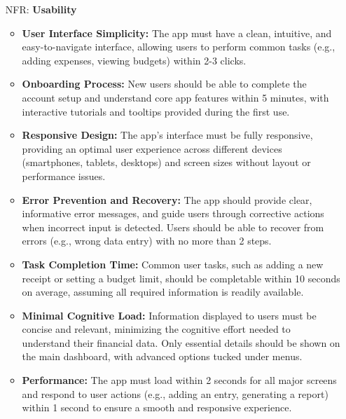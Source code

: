 \documentclass[12pt]{article}
\newcounter{frnum} %
\newcounter{nfrnum} %
\begin{document}
\begin{itemize}
\item[NFR\refstepcounter{nfrnum}\thenfrnum \label{NFR_Usability}:] \textbf{Usability}
\begin{itemize}
	\item \textbf{User Interface Simplicity:} The app must have a clean, intuitive, and easy-to-navigate interface, allowing users to perform common tasks (e.g., adding expenses, viewing budgets) within 2-3 clicks.
	\item \textbf{Onboarding Process:} New users should be able to complete the account setup and understand core app features within 5 minutes, with interactive tutorials and tooltips provided during the first use.
	\item \textbf{Responsive Design:} The app’s interface must be fully responsive, providing an optimal user experience across different devices (smartphones, tablets, desktops) and screen sizes without layout or performance issues.
	\item \textbf{Error Prevention and Recovery:} The app should provide clear, informative error messages, and guide users through corrective actions when incorrect input is detected. Users should be able to recover from errors (e.g., wrong data entry) with no more than 2 steps.
	\item \textbf{Task Completion Time:} Common user tasks, such as adding a new receipt or setting a budget limit, should be completable within 10 seconds on average, assuming all required information is readily available.
	\item \textbf{Minimal Cognitive Load:} Information displayed to users must be concise and relevant, minimizing the cognitive effort needed to understand their financial data. Only essential details should be shown on the main dashboard, with advanced options tucked under menus.
	\item \textbf{Performance:} The app must load within 2 seconds for all major screens and respond to user actions (e.g., adding an entry, generating a report) within 1 second to ensure a smooth and responsive experience.
\end{itemize}


\end{itemize}
\end{document}
